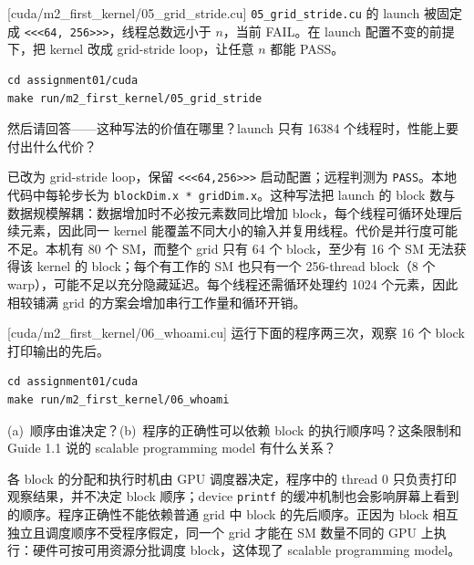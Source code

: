 \documentclass[11pt,a4paper,fontset=none]{ctexart}
\begin{document}
[cuda/m2\_first\_kernel/05\_grid\_stride.cu]
\texttt{05\_grid\_stride.cu} 的 launch 被固定成 \texttt{<<<64, 256>>>}，线程总数远小于 $n$，当前 FAIL。在 launch 配置不变的前提下，把 kernel 改成 grid-stride loop，让任意 $n$ 都能 PASS。

\begin{lstlisting}
cd assignment01/cuda
make run/m2_first_kernel/05_grid_stride
\end{lstlisting}

然后请回答——这种写法的价值在哪里？launch 只有 16384 个线程时，性能上要付出什么代价？

\begin{tcolorbox}[title={2.7 判测记录}]
已改为 grid-stride loop，保留 \texttt{<<<64,256>>>} 启动配置；远程判测为 \texttt{PASS}。本地代码中每轮步长为 \texttt{blockDim.x * gridDim.x}。这种写法把 launch 的 block 数与数据规模解耦：数据增加时不必按元素数同比增加 block，每个线程可循环处理后续元素，因此同一 kernel 能覆盖不同大小的输入并复用线程。代价是并行度可能不足。本机有 80 个 SM，而整个 grid 只有 64 个 block，至少有 16 个 SM 无法获得该 kernel 的 block；每个有工作的 SM 也只有一个 256-thread block（8 个 warp），可能不足以充分隐藏延迟。每个线程还需循环处理约 1024 个元素，因此相较铺满 grid 的方案会增加串行工作量和循环开销。
\end{tcolorbox}

[cuda/m2\_first\_kernel/06\_whoami.cu]
运行下面的程序两三次，观察 16 个 block 打印输出的先后。

\begin{lstlisting}
cd assignment01/cuda
make run/m2_first_kernel/06_whoami
\end{lstlisting}

(a)~顺序由谁决定？(b)~程序的正确性可以依赖 block 的执行顺序吗？这条限制和 Guide 1.1 说的 scalable programming model 有什么关系？

\begin{tcolorbox}[title={2.8 作答（讨论后整理）}]
各 block 的分配和执行时机由 GPU 调度器决定，程序中的 thread 0 只负责打印观察结果，并不决定 block 顺序；device \texttt{printf} 的缓冲机制也会影响屏幕上看到的顺序。程序正确性不能依赖普通 grid 中 block 的先后顺序。正因为 block 相互独立且调度顺序不受程序假定，同一个 grid 才能在 SM 数量不同的 GPU 上执行：硬件可按可用资源分批调度 block，这体现了 scalable programming model。
\end{tcolorbox}
\end{document}
